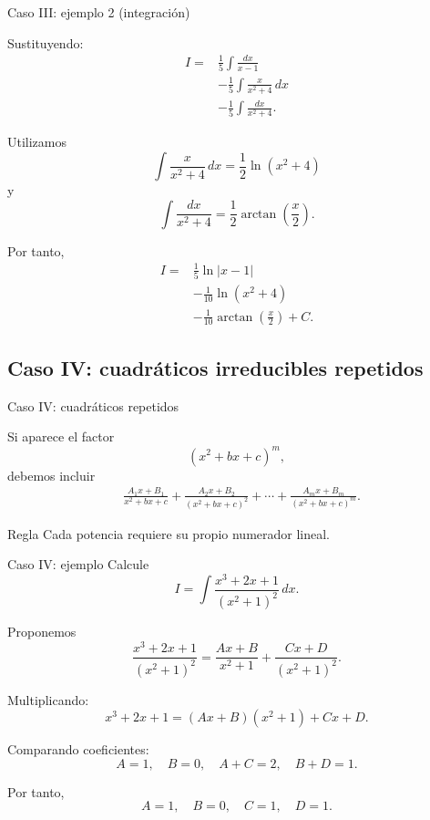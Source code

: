 \documentclass[10pt,aspectratio=169]{beamer}
\begin{document}
\begin{frame}{Caso III: ejemplo 2 (integración)}
\small

Sustituyendo:
\[
\begin{aligned}
I={}&\frac15\int\frac{dx}{x-1}\\
&-\frac15\int\frac{x}{x^2+4}\,dx\\
&-\frac15\int\frac{dx}{x^2+4}.
\end{aligned}
\]

Utilizamos
\[
\int\frac{x}{x^2+4}\,dx
=\frac12\ln(x^2+4)
\]
y
\[
\int\frac{dx}{x^2+4}
=\frac12\arctan\left(\frac x2\right).
\]

Por tanto,
\[
\boxed{
\begin{aligned}
I={}&\frac15\ln|x-1|\\
&-\frac1{10}\ln(x^2+4)\\
&-\frac1{10}\arctan\left(\frac x2\right)+C.
\end{aligned}
}
\]
\end{frame}

\subsection{Caso IV: cuadráticos irreducibles repetidos}

\begin{frame}{Caso IV: cuadráticos repetidos}
\small

Si aparece el factor
\[
(x^2+bx+c)^m,
\]
debemos incluir
\[
\boxed{
\begin{aligned}
&\frac{A_1x+B_1}{x^2+bx+c}+\frac{A_2x+B_2}{(x^2+bx+c)^2}+\cdots+\frac{A_mx+B_m}{(x^2+bx+c)^m}.
\end{aligned}
}
\]

\begin{alertblock}{Regla}
Cada potencia requiere su propio
numerador lineal.
\end{alertblock}
\end{frame}

\begin{frame}{Caso IV: ejemplo}
\small
Calcule
\[
I=\int\frac{x^3+2x+1}{(x^2+1)^2}\,dx.
\]

Proponemos
\[
\frac{x^3+2x+1}{(x^2+1)^2}
=
\frac{Ax+B}{x^2+1}
+\frac{Cx+D}{(x^2+1)^2}.
\]

Multiplicando:
\[
x^3+2x+1
=
(Ax+B)(x^2+1)+Cx+D.
\]

Comparando coeficientes:
\[
A=1,\quad B=0,\quad
A+C=2,\quad B+D=1.
\]

Por tanto,
\[
\boxed{
A=1,\quad B=0,\quad C=1,\quad D=1.
}
\]
\end{frame}
\end{document}

